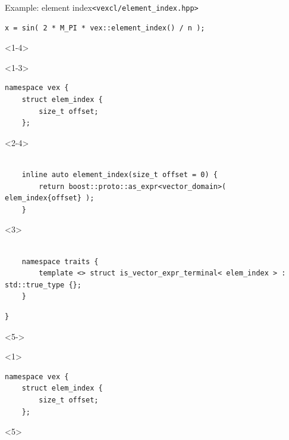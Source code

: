 \documentclass[@BEAMER_OPTIONS@]{beamer}
\newcommand{\code}[1]{\lstinline|#1|}
\begin{document}
\note{ }

\begin{frame}[fragile]{Example: element index}{\code{<vexcl/element_index.hpp>}}
    \begin{exampleblock}{}
        \begin{lstlisting}
x = sin( 2 * M_PI * vex::element_index() / n );
        \end{lstlisting}
    \end{exampleblock}
    \begin{exampleblock}{}
        \begin{onlyenv}<1-4>
            \begin{uncoverenv}<1-3>
                \begin{lstlisting}
namespace vex {
    struct elem_index {
        size_t offset;
    };
                \end{lstlisting}
            \end{uncoverenv}
            \begin{uncoverenv}<2-4>
                \begin{lstlisting}[firstnumber=last]

    inline auto element_index(size_t offset = 0) {
        return boost::proto::as_expr<vector_domain>( elem_index{offset} );
    }
                \end{lstlisting}
            \end{uncoverenv}
            \begin{uncoverenv}<3>
                \begin{lstlisting}[firstnumber=last]

    namespace traits {
        template <> struct is_vector_expr_terminal< elem_index > : std::true_type {};
    }
            \end{lstlisting}
        \end{uncoverenv}
        \begin{lstlisting}[firstnumber=last]
}
        \end{lstlisting}
        \end{onlyenv}
        \begin{onlyenv}<5->
        \begin{uncoverenv}<1>
            \begin{lstlisting}
namespace vex {
    struct elem_index {
        size_t offset;
    };
            \end{lstlisting}
        \end{uncoverenv}
        \begin{uncoverenv}<5>
            \begin{lstlisting}[firstnumber=last]


\end{lstlisting}
\end{uncoverenv}
\end{onlyenv}
\end{exampleblock}
\end{frame}
\end{document}
